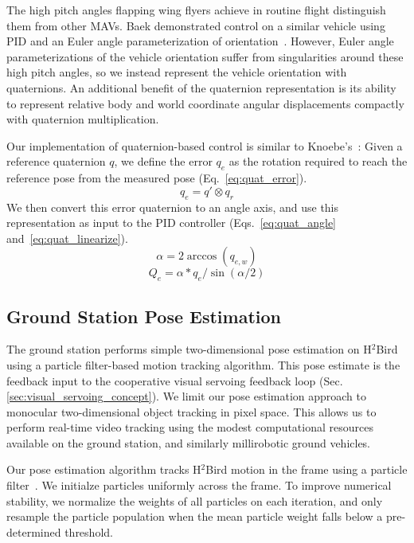 \documentclass{aamas2013}
\begin{document}
The high pitch angles flapping wing flyers achieve in routine flight distinguish them 
from other MAVs. Baek demonstrated control on a similar vehicle using PID and an Euler angle
parameterization of orientation~\cite{baek:tracking}. However, Euler angle parameterizations of the vehicle orientation 
suffer from singularities around these high pitch angles, so we instead 
represent the vehicle orientation with quaternions. An additional benefit of 
the quaternion representation is its ability to represent relative body and 
world coordinate angular displacements compactly with quaternion 
multiplication.

Our implementation of quaternion-based control is similar to Knoebe's~\cite{knoebe:quatcontrol}:
Given a reference quaternion $q$, we define the error $q_e$ as the rotation 
required to reach the reference pose from the measured pose (Eq.~\ref{eq:quat_error}). 
\begin{equation}
\label{eq:quat_error}
q_e = q'\otimes q_r
\end{equation}
We then convert this error quaternion to an angle axis, and use this 
representation as input to the PID controller 
(Eqs.~\ref{eq:quat_angle} and~\ref{eq:quat_linearize}). 
\begin{equation}
\label{eq:quat_angle}
\alpha = 2\arccos(q_{e,w})
\end{equation}
\begin{equation}
\label{eq:quat_linearize}
Q_e = \alpha*q_e/\sin(\alpha /2)
\end{equation}

\subsection{Ground Station Pose Estimation}
The ground station performs simple two-dimensional pose estimation on 
H$^2$Bird using a particle filter-based motion tracking algorithm. This pose 
estimate is the feedback input to the cooperative visual servoing feedback 
loop (Sec. \ref{sec:visual_servoing_concept}). We limit our pose estimation 
approach to monocular two-dimensional object tracking in pixel space. This 
allows us to perform real-time video tracking using the modest computational 
resources available on the ground station, and similarly millirobotic ground 
vehicles.

Our pose estimation algorithm tracks H$^2$Bird motion in the frame using a 
particle filter~\cite{thrun2005probabilistic}. We initialze particles 
uniformly across the frame. To improve numerical stability, we  normalize the 
weights of all particles on each iteration, and only resample the particle 
population when the mean particle weight falls below a pre-determined 
threshold.
\end{document}

